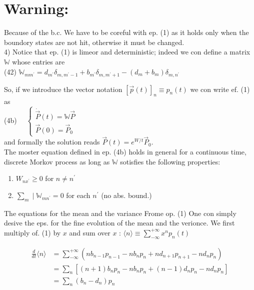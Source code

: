 \documentclass[10pt]{article}
\begin{document}
\section*{Warning:}
Because of the b.c. We have to be coreful with ep. (1) as it holds only when the boundory states are not hit, otherwise it must be changed.\\
4) Notice that ep. (1) is limeor and deterministic; indeed we con define a matrix $\mathbb{W}$ whose entries are\\
(42) $\mathbb{W}_{m m^{\prime}}=d_{m^{\prime}} \delta_{m, m^{\prime}-1}+b_{m^{\prime}} \delta_{m, m^{\prime}+1}-\left(d_{m}+b_{m}\right) \delta_{m, n^{\prime}}$

So, if we introduce the vector notation $[\vec{p}(t)]_{n} \equiv p_{n}(t)$ we con write ef. (1) as\\
(4b) $\quad\left\{\begin{array}{l}\dot{\vec{P}}(t)=\mathbb{W} \vec{P} \\ \vec{P}(0)=\vec{P}_{0}\end{array}\right.$\\
and formally the solution reads $\vec{P}(t)=e^{W / t} \vec{P}_{0}$.\\
The moster equation defined in ep. (4b) holds in general for a continuous time, discrete Morkov process as long as $\mathbb{W}$ sotisfies the following properties:

\begin{enumerate}
  \item $W_{n x^{\prime}} \geqslant 0$ for $n \neq n^{\prime}$
  \item $\sum_{m} \mid \mathbb{W}_{m n^{\prime}}=0$ for each $n^{\prime}$ (no abs. bound.)
\end{enumerate}

The equations for the mean and the variance Frome op. (1) One con simply desive the eps. for the fine evolution of the mean and the verionce. We first multiply of. (1) by $x$ and sum over $x$ : $\langle n\rangle \equiv \sum_{-\infty}^{+\infty} x^{n} p_{n}(t)$

$$
\begin{aligned}
\frac{d}{d t}\langle n\rangle & =\sum_{-\infty}^{+\infty}\left(n b_{n-1} p_{n-1}-n b_{n} p_{n}+n d_{n+1} p_{n+1}-n d_{n} p_{n}\right) \\
& =\sum_{n}\left[(n+1) b_{n} p_{n}-n b_{n} p_{n}+(n-1) d_{n} p_{n}-n d_{n} p_{n}\right] \\
& =\sum_{n}\left(b_{n}-d_{n}\right) p_{n}
\end{aligned}
$$
\end{document}
